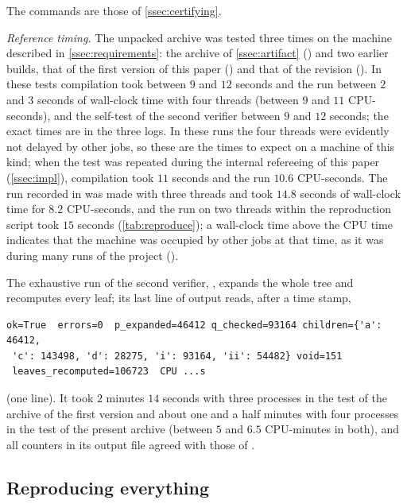 The commands are those of \cref{ssec:certifying}.

\emph{Reference timing.} The unpacked archive was tested three times on the machine described in
\cref{ssec:requirements}: the archive of \cref{ssec:artifact}
() and two earlier builds, that of the first version of this paper
() and that of the revision
(). In these tests compilation took between $9$ and $12$
seconds and the run between $2$ and $3$ seconds of wall-clock time with four threads (between $9$ and
$11$ CPU-seconds), and the self-test of the second verifier between $9$ and $12$ seconds; the exact times
are in the three logs. In these runs the four threads were evidently
not delayed by other jobs, so these are the times to expect on a machine of this kind; when the test
was repeated during the internal refereeing of this paper (\cref{ssec:impl}), compilation took $11$
seconds and the run $10.6$ CPU-seconds. The run recorded in
 was made with three threads and took $14.8$ seconds of wall-clock time
for $8.2$ CPU-seconds, and the run on two threads within the reproduction script took $15$ seconds
(\cref{tab:reproduce}); a wall-clock time above the CPU time indicates that the machine was occupied by
other jobs at that time, as it was during many runs of the project ().

The exhaustive run of the second verifier, , expands the whole tree and recomputes
every leaf; its last line of output reads, after a time stamp,
{\small
\begin{verbatim}
ok=True  errors=0  p_expanded=46412 q_checked=93164 children={'a': 46412,
 'c': 143498, 'd': 28275, 'i': 93164, 'ii': 54482} void=151
 leaves_recomputed=106723  CPU ...s
\end{verbatim}
}
\noindent(one line). It took $2$ minutes $14$ seconds with three processes in the test of the archive of
the first version and about one and a half minutes with four processes in the test of the present
archive (between $5$ and $6.5$ CPU-minutes in both), and all counters in its output file agreed with those of
.

\subsection{Reproducing everything}\label{ssec:supp-reproduce}

